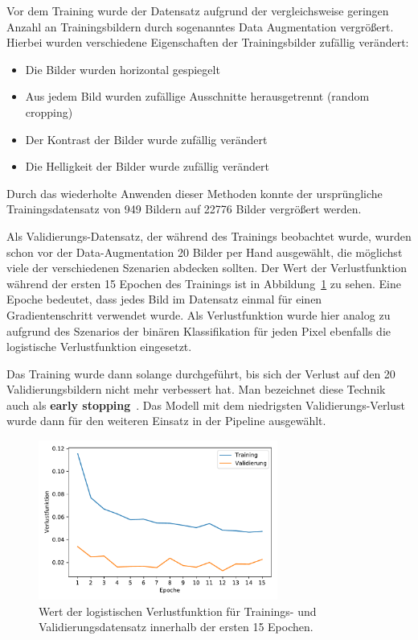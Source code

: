 Vor dem Training wurde der Datensatz aufgrund der vergleichsweise
geringen Anzahl an Trainingsbildern durch sogenanntes Data Augmentation
vergr\"o{\ss}ert. Hierbei wurden verschiedene Eigenschaften der
Trainingsbilder zuf\"allig ver\"andert:
\begin{itemize}
    \item Die Bilder wurden horizontal gespiegelt
    \item Aus jedem Bild wurden zuf\"allige Ausschnitte herausgetrennt (random cropping)
    \item Der Kontrast der Bilder wurde zuf\"allig ver\"andert
    \item Die Helligkeit der Bilder wurde zuf\"allig ver\"andert
\end{itemize}
Durch das wiederholte Anwenden dieser Methoden konnte der urspr\"ungliche
Trainingsdatensatz von 949 Bildern auf 22776 Bilder vergr\"o{\ss}ert werden.

Als Validierungs-Datensatz, der w\"ahrend des Trainings beobachtet wurde,
wurden schon vor der Data-Augmentation 20 Bilder per Hand ausgew\"ahlt,
die m\"oglichst viele der verschiedenen Szenarien abdecken sollten.
Der Wert der Verlustfunktion w\"ahrend der ersten 15 Epochen des Trainings ist in
Abbildung~\ref{fig:training-loss} zu sehen.
Eine Epoche bedeutet, dass jedes Bild im Datensatz einmal f\"ur einen
Gradientenschritt verwendet wurde.
Als Verlustfunktion wurde hier analog zu~\cite{image-segmentation} aufgrund
des Szenarios der bin\"aren Klassifikation f\"ur jeden Pixel
ebenfalls die logistische Verlustfunktion eingesetzt.

Das Training wurde dann solange durchgef\"uhrt, bis sich der Verlust auf den
20 Validierungsbildern nicht mehr verbessert hat. Man bezeichnet diese
Technik auch als \textbf{early stopping}~\cite{Goodfellow-et-al-2016}.
Das Modell mit dem niedrigsten Validierungs-Verlust wurde dann f\"ur
den weiteren Einsatz in der Pipeline ausgew\"ahlt.

\begin{figure}
    \centering
    \includegraphics[width=0.7\textwidth]{abbildungen/training_plot}
    \caption[Trainings- und Validierungsverlust]{Wert der logistischen Verlustfunktion f\"ur Trainings- und Validierungsdatensatz
        innerhalb der ersten 15 Epochen.}
    \label{fig:training-loss}
\end{figure}

